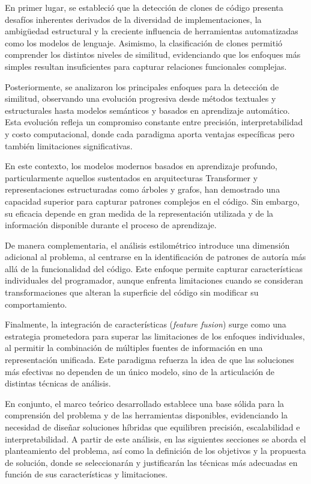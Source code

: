 En primer lugar, se estableció que la detección de clones de código presenta desafíos inherentes derivados de la diversidad de implementaciones, la ambigüedad estructural y la creciente influencia de herramientas automatizadas como los modelos de lenguaje. Asimismo, la clasificación de clones permitió comprender los distintos niveles de similitud, evidenciando que los enfoques más simples resultan insuficientes para capturar relaciones funcionales complejas.

Posteriormente, se analizaron los principales enfoques para la detección de similitud, observando una evolución progresiva desde métodos textuales y estructurales hasta modelos semánticos y basados en aprendizaje automático. Esta evolución refleja un compromiso constante entre precisión, interpretabilidad y costo computacional, donde cada paradigma aporta ventajas específicas pero también limitaciones significativas.

En este contexto, los modelos modernos basados en aprendizaje profundo, particularmente aquellos sustentados en arquitecturas Transformer y representaciones estructuradas como árboles y grafos, han demostrado una capacidad superior para capturar patrones complejos en el código. Sin embargo, su eficacia depende en gran medida de la representación utilizada y de la información disponible durante el proceso de aprendizaje.

De manera complementaria, el análisis estilométrico introduce una dimensión adicional al problema, al centrarse en la identificación de patrones de autoría más allá de la funcionalidad del código. Este enfoque permite capturar características individuales del programador, aunque enfrenta limitaciones cuando se consideran transformaciones que alteran la superficie del código sin modificar su comportamiento.

Finalmente, la integración de características (\textit{feature fusion}) surge como una estrategia prometedora para superar las limitaciones de los enfoques individuales, al permitir la combinación de múltiples fuentes de información en una representación unificada. Este paradigma refuerza la idea de que las soluciones más efectivas no dependen de un único modelo, sino de la articulación de distintas técnicas de análisis.

En conjunto, el marco teórico desarrollado establece una base sólida para la comprensión del problema y de las herramientas disponibles, evidenciando la necesidad de diseñar soluciones híbridas que equilibren precisión, escalabilidad e interpretabilidad. A partir de este análisis, en las siguientes secciones se aborda el planteamiento del problema, así como la definición de los objetivos y la propuesta de solución, donde se seleccionarán y justificarán las técnicas más adecuadas en función de sus características y limitaciones.
